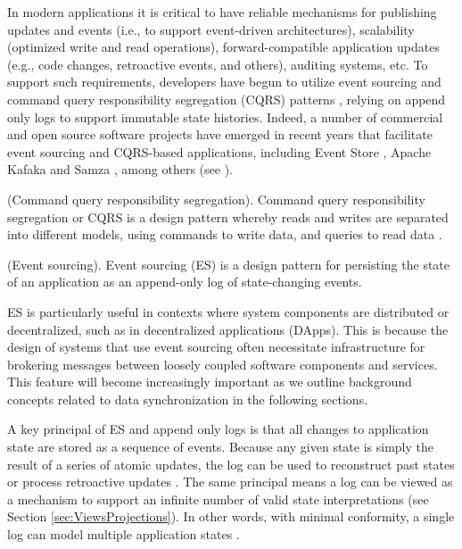 \documentclass{textile}
\begin{document}
In modern applications it is critical to have reliable mechanisms for publishing updates and events (i.e., to support event-driven architectures), scalability (optimized write and read operations), forward-compatible application updates (e.g., code changes, retroactive events, and others), auditing systems, etc. To support such requirements, developers have begun to utilize event sourcing and command query responsibility segregation (CQRS) patterns \cite{bettsExploringCQRSEvent2013}, relying on append only logs to support immutable state histories. Indeed, a number of commercial and open source software projects have emerged in recent years that facilitate event sourcing and CQRS-based applications, including Event Store \cite{EventStore}, Apache Kafaka \cite{ApacheKafka} and Samza \cite{ApacheSamza}, among others (see \cite{kleppmannDesigningDataintensiveApplications2017}). 

\begin{definition} (Command query responsibility segregation). Command query responsibility segregation or CQRS is a design pattern whereby reads and writes are separated into different models, using commands to write data, and queries to read data \cite{martinfowlerCQRS2011}. \end{definition}

\begin{definition} (Event sourcing). Event sourcing (ES) is a design pattern for persisting the state of an application as an append-only log of state-changing events. \end{definition}

ES is particularly useful in contexts where system components are distributed or decentralized, such as in decentralized applications (DApps). This is because the design of systems that use event sourcing often necessitate infrastructure for brokering messages between loosely coupled software components and services. This feature will become increasingly important as we outline background concepts related to data synchronization in the following sections. 

A key principal of ES and append only logs is that all changes to application state are stored as a sequence of events. Because any given state is simply the result of a series of atomic updates, the log can be used to reconstruct past states or process retroactive updates \cite{fowlerEventSourcing}. The same principal means a log can be viewed as a mechanism to support an infinite number of valid state interpretations (see Section  \ref{sec:ViewsProjections}). In other words, with minimal conformity, a single log can model multiple application states \cite{microsoftcorporationAzureApplicationArchitecture}.
\end{document}
